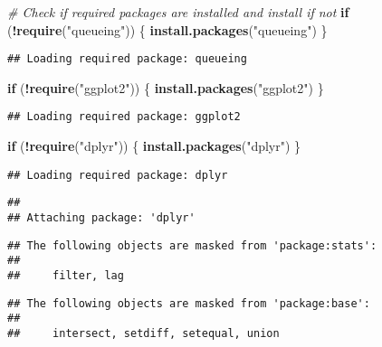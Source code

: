 \documentclass[
]{article}
\author{}
\date{\vspace{-2.5em}}
\newenvironment{Shaded}{\begin{snugshade}}{\end{snugshade}}
\newcommand{\CommentTok}[1]{\textcolor[rgb]{0.56,0.35,0.01}{\textit{#1}}}
\newcommand{\ControlFlowTok}[1]{\textcolor[rgb]{0.13,0.29,0.53}{\textbf{#1}}}
\newcommand{\FunctionTok}[1]{\textcolor[rgb]{0.13,0.29,0.53}{\textbf{#1}}}
\newcommand{\NormalTok}[1]{#1}
\newcommand{\SpecialCharTok}[1]{\textcolor[rgb]{0.81,0.36,0.00}{\textbf{#1}}}
\newcommand{\StringTok}[1]{\textcolor[rgb]{0.31,0.60,0.02}{#1}}
\begin{document}
\begin{Shaded}
\begin{Highlighting}[]
\CommentTok{\# Check if required packages are installed and install if not}
\ControlFlowTok{if}\NormalTok{ (}\SpecialCharTok{!}\FunctionTok{require}\NormalTok{(}\StringTok{"queueing"}\NormalTok{)) \{}
  \FunctionTok{install.packages}\NormalTok{(}\StringTok{"queueing"}\NormalTok{)}
\NormalTok{\}}
\end{Highlighting}
\end{Shaded}

\begin{verbatim}
## Loading required package: queueing
\end{verbatim}

\begin{Shaded}
\begin{Highlighting}[]
\ControlFlowTok{if}\NormalTok{ (}\SpecialCharTok{!}\FunctionTok{require}\NormalTok{(}\StringTok{"ggplot2"}\NormalTok{)) \{}
  \FunctionTok{install.packages}\NormalTok{(}\StringTok{"ggplot2"}\NormalTok{)}
\NormalTok{\}}
\end{Highlighting}
\end{Shaded}

\begin{verbatim}
## Loading required package: ggplot2
\end{verbatim}

\begin{Shaded}
\begin{Highlighting}[]
\ControlFlowTok{if}\NormalTok{ (}\SpecialCharTok{!}\FunctionTok{require}\NormalTok{(}\StringTok{"dplyr"}\NormalTok{)) \{}
  \FunctionTok{install.packages}\NormalTok{(}\StringTok{"dplyr"}\NormalTok{)}
\NormalTok{\}}
\end{Highlighting}
\end{Shaded}

\begin{verbatim}
## Loading required package: dplyr
\end{verbatim}

\begin{verbatim}
## 
## Attaching package: 'dplyr'
\end{verbatim}

\begin{verbatim}
## The following objects are masked from 'package:stats':
## 
##     filter, lag
\end{verbatim}

\begin{verbatim}
## The following objects are masked from 'package:base':
## 
##     intersect, setdiff, setequal, union
\end{verbatim}
\end{document}
